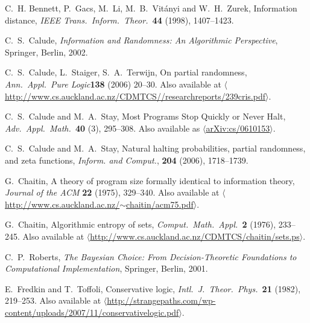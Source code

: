\documentclass{article}
\begin{document}
\begin{thebibliography}{10}
  
 C.\ H. Bennett, P.\ Gacs, M.\ Li, M.\ B.\ Vit\'anyi
and W.\ H.\ Zurek, Information distance, \textit{IEEE Trans.\ 
Inform.\ Theor.\ }\textbf{44} (1998), 1407--1423.

 C.\ S.\ Calude, {\sl Information and Randomness: 
An Algorithmic Perspective}, Springer, Berlin, 2002.

 C.\ S.\ Calude, L.\ Staiger, S.\ A.\ Terwijn, On
partial randomness, {\sl Ann.\ Appl.\ Pure Logic}\textbf{138} (2006)
20--30. Also available at
\href{http://www.cs.auckland.ac.nz/CDMTCS//researchreports/239cris.pdf}
{$\langle$http://www.cs.auckland.ac.nz/CDMTCS//researchreports/239cris.pdf$\rangle$}.

 C.\ S.\ Calude and M.\ A.\ Stay, 
Most Programs Stop Quickly or Never Halt, 
{\sl Adv.\ Appl.\ Math.\ }\textbf{40} (3), 295--308.
Also available as
\href{http://arxiv.org/abs/cs/0610153}
{$\langle$arXiv:cs/0610153$\rangle$}.

 C.\ S.\ Calude and M.\ A.\ Stay, 
Natural halting probabilities, partial randomness, and zeta 
functions, \textsl{Inform. and Comput.}, \textbf{204} (2006), 
1718--1739. 

 G.\ Chaitin, A theory of program size formally
identical to information theory, {\sl Journal of the ACM} \textbf{22}
(1975), 329--340. Also available at
\href{http://www.cs.auckland.ac.nz/~chaitin/acm75.pdf}
{$\langle$http://www.cs.auckland.ac.nz/$\sim$chaitin/acm75.pdf$\rangle$}.

 G.\ Chaitin, Algorithmic entropy of sets, 
{\sl Comput.\ Math.\ Appl.\ }\textbf{2} (1976), 
233--245.  Also available at \hfill \break
\href{http://www.cs.auckland.ac.nz/CDMTCS/chaitin/sets.ps}
{$\langle$http://www.cs.auckland.ac.nz/CDMTCS/chaitin/sets.ps$\rangle$}.

 C.\ P.\ Roberts, 
{\sl The Bayesian Choice: From Decision-Theoretic Foundations to 
Computational Implementation}, Springer, Berlin, 2001.

 E.\ Fredkin and T.\ Toffoli, Conservative logic, 
\textit{Intl.\ J.\ Theor.\ Phys.\ }\textbf{21} (1982), 219--253.
Also available at 
\hfill \break
\href{http://strangepaths.com/wp-content/uploads/2007/11/conservativelogic.pdf}
{$\langle$http://strangepaths.com/wp-content/uploads/2007/11/conservativelogic.pdf$\rangle$}.


\end{thebibliography}
\end{document}
